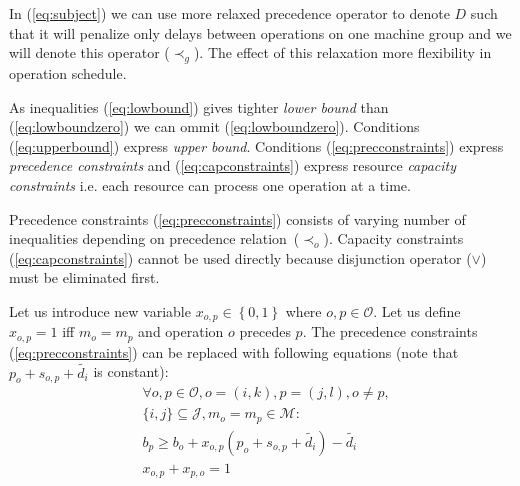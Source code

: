 \documentclass[a4paper,journal,twocolumn]{IEEEtran}
\begin{document}
In (\ref{eq:subject}) we can use more relaxed precedence operator to denote $D$ such that it will penalize 
only delays between operations on one machine group and we will denote this operator ($\prec_g$). The effect 
of this relaxation more flexibility in operation schedule.

As inequalities (\ref{eq:lowbound}) gives tighter \emph{lower bound} than (\ref{eq:lowboundzero}) we can ommit
(\ref{eq:lowboundzero}).
Conditions (\ref{eq:upperbound}) express \emph{upper bound}. Conditions (\ref{eq:precconstraints}) express
\emph{precedence constraints} and (\ref{eq:capconstraints}) express resource \emph{capacity constraints}
i.e. each resource can process one operation at a time.

Precedence constraints (\ref{eq:precconstraints}) consists of varying number of inequalities depending on 
precedence relation~($\prec_o$). Capacity constraints (\ref{eq:capconstraints}) cannot be used directly 
because disjunction operator ($\vee$) must be eliminated first.

Let us introduce new variable $x_{o,p}\in\left\{0,1\right\}$ where $o,p\in\mathcal{O}$. 
Let us define $x_{o,p} = 1 $ iff $m_o = m_p $ and operation $o$ precedes $p$.
The precedence constraints (\ref{eq:precconstraints}) can be replaced with following equations
(note that $p_o+s_{o,p} + \tilde{d_i}$ is constant):
\begin{align}
	& \forall o,p\in\mathcal{O},o=(i,k),p=(j,l),o\neq p, \nonumber \\
	& \{i,j\}\subseteq\mathcal{J}, m_o=m_p\in \mathcal{M}: \nonumber \\
	& b_p \ge b_o + x_{o,p}(p_o+s_{o,p} + \tilde{d_i}) - \tilde{d_i}\\
	&  x_{o,p}+x_{p,o} = 1
\end{align}
\end{document}
